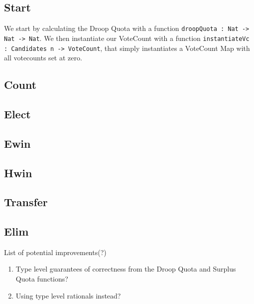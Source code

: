 \subsection{Start}
We start by calculating the Droop Quota with a function \texttt{droopQuota : Nat
-> Nat -> Nat}. We then instantiate our VoteCount with a function
\texttt{instantiateVc : Candidates n -> VoteCount}, that simply instantiates a
VoteCount Map with all votecounts set at zero. 

\subsection{Count}



\subsection{Elect}

\subsection{Ewin}

\subsection{Hwin}

\subsection{Transfer}

\subsection{Elim}

List of potential improvements(?)
\begin{enumerate}
    \item Type level guarantees of correctness from the Droop Quota and Surplus Quota functions?
    \item Using type level rationals instead?
\end{enumerate}